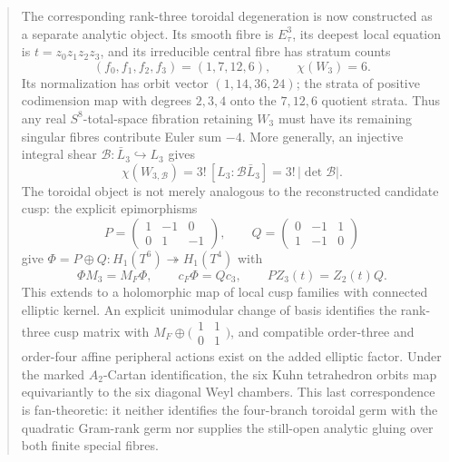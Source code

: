 \documentclass[11pt,letterpaper]{article}
\theoremstyle{definition}
\theoremstyle{remark}
\begin{document}
\begin{abstract}
 The corresponding rank-three toroidal degeneration is now constructed as a
 separate analytic object.  Its smooth fibre is \(E_\tau^3\), its deepest
 local equation is \(t=z_0z_1z_2z_3\), and its irreducible central fibre has
 stratum counts
 \[
  (f_0,f_1,f_2,f_3)=(1,7,12,6),\qquad \chi(W_3)=6.
 \]
 Its normalization has orbit vector \((1,14,36,24)\); the strata of positive
 codimension map with degrees \(2,3,4\) onto the \(7,12,6\) quotient strata.
 Thus any real \(S^8\)-total-space fibration retaining \(W_3\) must have its
 remaining singular fibres contribute Euler sum \(-4\).
 More generally, an injective integral shear
 \(\mathcal B:\bar L_3\hookrightarrow L_3\) gives
 \[
  \chi(W_{3,\mathcal B})=3!\,[L_3:\mathcal B\bar L_3]
  =3!\,|\det\mathcal B|.
 \]
 The toroidal object is not merely analogous to the reconstructed candidate
 cusp: the explicit epimorphisms
 \[
  P=\begin{pmatrix}1&-1&0\\0&1&-1\end{pmatrix},
  \qquad
  Q=\begin{pmatrix}0&-1&1\\1&-1&0\end{pmatrix}
 \]
 give \(\Phi=P\oplus Q:H_1(T^6)\twoheadrightarrow H_1(T^4)\) with
 \[
  \Phi M_3=M_F\Phi,\qquad c_F\Phi=Qc_3,
  \qquad PZ_3(t)=Z_2(t)Q.
 \]
 This extends to a holomorphic map of local cusp families with connected
 elliptic kernel.  An explicit unimodular change of basis identifies the
 rank-three cusp matrix with \(M_F\oplus
 \bigl(\begin{smallmatrix}1&1\\0&1\end{smallmatrix}\bigr)\), and compatible
 order-three and order-four affine peripheral actions exist on the added
 elliptic factor.  Under the marked \(A_2\)-Cartan identification, the six
 Kuhn tetrahedron orbits map equivariantly to the six diagonal Weyl chambers.
  This last correspondence is fan-theoretic: it neither identifies the
  four-branch toroidal germ with the quadratic Gram-rank germ nor supplies the
  still-open analytic gluing over both finite special fibres.


\end{abstract}
\end{document}
